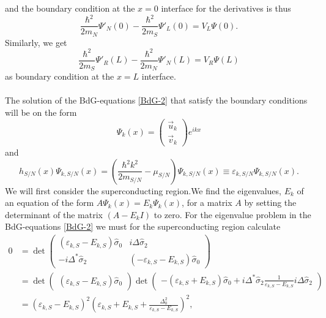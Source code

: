 and the boundary condition at the $x=0$ interface for the derivatives is thus
\begin{equation}
    \frac{\hbar^2}{2m_N} \Psi'_N(0) - \frac{\hbar^2}{2m_S} \Psi'_L(0) = V_L\Psi(0).
\end{equation}
Similarly, we get
\begin{equation}
    \frac{\hbar^2}{2m_S} \Psi'_R(L) - \frac{\hbar^2}{2m_N} \Psi'_N(L) = V_R\Psi(L)
\end{equation}
as boundary condition at the $x=L$ interface.
\\
\\
The solution of the BdG-equations \eqref{BdG-2} that satisfy the boundary conditions will be on the form 
\begin{equation}
    \Psi_{k}(x) = 
    \begin{pmatrix}
    \vec{u}_k \\ \vec{v}_k
    \end{pmatrix}
    e^{ikx}
\end{equation}
and 
\begin{equation}
    h_{S/N}(x)\Psi_{k,S/N}(x) = \left(\frac{\hbar^2k^2}{2m_{S/N}}-\mu_{S/N}\right)\Psi_{k,S/N}(x) \equiv \varepsilon_{k,S/N} \Psi_{k,S/N}(x).
\end{equation}
We will first consider the superconducting region.We find the eigenvalues, $E_k$ of an equation of the form $A\Psi_k(x) = E_k\Psi_k(x)$, for a matrix $A$ by setting the determinant of the matrix $(A-E_kI)$ to zero. For the eigenvalue problem in the BdG-equations \eqref{BdG-2} we must for the superconducting region calculate
\begin{equation}
\begin{split}
    0 &= 
    \det\begin{pmatrix}
        \left(\varepsilon_{k,S} - E_{k,S}\right)\hat{\sigma}_0 & i\Delta\hat{\sigma}_2 \\
        -i\Delta^*\hat{\sigma}_2 & \left(-\varepsilon_{k,S} - E_{k,S}\right)\hat{\sigma}_0
    \end{pmatrix}
    \\ &= 
    \det\begin{pmatrix}(\varepsilon_{k,S} -E_{k,S})\hat{\sigma}_0\end{pmatrix}
    \det\begin{pmatrix}
    -(\varepsilon_{k,S} + E_{k,S})\hat{\sigma}_0 + i\Delta^*\hat{\sigma}_2\frac{1}{\varepsilon_{k,S}-E_{k,S}}i\Delta\hat{\sigma}_2
    \end{pmatrix}
    \\&=
    \left(\varepsilon_{k,S}-E_{k,S}\right)^2\left(\varepsilon_{k,S} + E_{k,S} + \frac{\Delta_0^2}{\varepsilon_{k,S} - E_{k,S}}\right)^2,
\end{split}
\label{det}
\end{equation}
